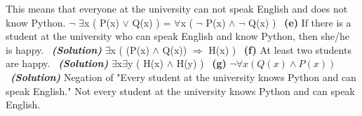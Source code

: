 \documentclass[a4 paper]{article}
\numberwithin{equation}{section}
\newcommand{\subproblem}[1]{~\newline\textbf{(#1)}}
\newcommand{\solution}{~\newline\textbf{\textit{(Solution)}} }
\newcommand{\0}{\mathbf{0}}
\begin{document}
This means that everyone at the university can not speak English and does not know Python.
\newline
$\neg$ $\exists$x ( P(x) $\vee$ Q(x) ) = $\forall$x ( $\neg$ P(x) $\wedge$ $\neg$ Q(x) )
\newline
\subproblem{e} If there is a student at the university who can speak English and know Python, then she/he is happy.
\solution
\newline
\newline
$\exists$x ( (P(x) $\wedge$ Q(x)) $\Rightarrow$ H(x) )
\newline
\subproblem{f} At least two students are happy.
\solution
\newline
\newline
$\exists$x$\exists$y ( H(x) $\wedge$ H(y) )
\newline
\subproblem{g} $\neg \forall x (Q(x) \wedge P(x))$
\solution
\newline
\newline
Negation of "Every student at the university knows Python and can speak English."
\newline
Not every student at the university knows Python and can speak English.
\newpage
\end{document}
